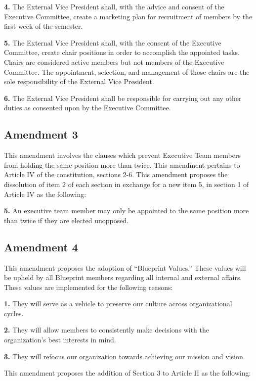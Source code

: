\documentclass{article}
\begin{document}
\textbf{4.} The External Vice President shall, with the advice and consent of the Executive Committee, create a marketing plan for recruitment of members by the first week of the semester.

\textbf{5.} The External Vice President shall, with the consent of the Executive Committee, create chair positions in order to accomplish the appointed tasks. Chairs are considered active members but not members of the Executive Committee. The appointment, selection, and management of those chairs are the sole responsibility of the External Vice President.

\textbf{6.} The External Vice President shall be responsible for carrying out any other duties as consented upon by the Executive Committee.

\subsection{Amendment 3}

This amendment involves the clauses which prevent Executive Team members from holding the same position more than twice. This amendment pertains to Article IV of the constitution, sections 2-6. This amendment proposes the dissolution of item 2 of each section in exchange for a new item 5, in section 1 of Article IV as the following:

\textbf{5.} An executive team member may only be appointed to the same position more than twice if they are elected unopposed.

\subsection{Amendment 4}

This amendment proposes the adoption of “Blueprint Values.” These values will be upheld by all Blueprint members regarding all internal and external affairs. These values are implemented for the following reasons:

\textbf{1.} They will serve as a vehicle to preserve our culture across organizational cycles.

\textbf{2.} They will allow members to consistently make decisions with the organization’s best interests in mind.

\textbf{3.} They will refocus our organization towards achieving our mission and vision.

This amendment proposes the addition of Section 3 to Article II as the following:
\end{document}
